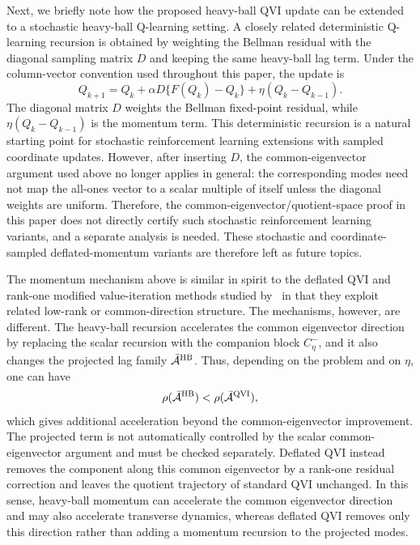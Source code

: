 \documentclass[letterpaper]{article}
\numberwithin{equation}{section}
\begin{document}
Next, we briefly note how the proposed heavy-ball QVI update can be extended to a
stochastic heavy-ball Q-learning setting. A closely related deterministic Q-learning recursion is obtained by weighting the
Bellman residual with the diagonal sampling matrix $D$ and keeping the same
heavy-ball lag term. Under the column-vector convention used throughout this
paper, the update is
\begin{equation*}
  Q_{k+1}=Q_k+\alpha D\{F(Q_k)-Q_k\}+\eta(Q_k-Q_{k-1}).
\end{equation*}
The diagonal matrix $D$ weights the Bellman fixed-point residual, while $\eta(Q_k-Q_{k-1})$ is the
momentum term. This deterministic recursion is a natural starting point for
stochastic reinforcement learning extensions with sampled coordinate updates. However, after
inserting $D$, the common-eigenvector argument used above no longer applies in
general: the corresponding modes need not map the all-ones vector to a scalar
multiple of itself unless the diagonal weights are uniform.
Therefore, the common-eigenvector/quotient-space proof in this paper does not directly
certify such stochastic reinforcement learning variants, and a separate analysis is needed.
These stochastic and coordinate-sampled deflated-momentum variants are therefore left as future topics.


The momentum mechanism above is similar in spirit to the deflated QVI and rank-one modified value-iteration methods studied by~\citet{bertsekas1995rankone,kolarijani2025rankone,lee2025deflateddynamics,lee2026deflated} in that they exploit related low-rank or common-direction structure. The
mechanisms, however, are different. The heavy-ball recursion accelerates the
common eigenvector direction by replacing the scalar recursion with the companion block
$C_\eta^-$, and it also changes the projected lag family
$\bar{\mathcal A}^{\rm HB}$. Thus, depending on the problem and on $\eta$, one can
have
\begin{align*}
  \rho(\bar{\mathcal A}^{\rm HB})<\rho(\bar{\mathcal A}^{\rm QVI}),
\end{align*}
which gives additional acceleration beyond the common-eigenvector improvement. The
projected term is not automatically controlled by the scalar common-eigenvector
argument and must be checked separately. Deflated QVI instead removes the
component along this common eigenvector by a rank-one residual correction and leaves the quotient
trajectory of standard QVI unchanged. In this sense,
heavy-ball momentum can accelerate the common eigenvector direction and may also
accelerate transverse dynamics, whereas deflated QVI removes only
this direction rather than adding a momentum recursion to the projected modes.
\end{document}
